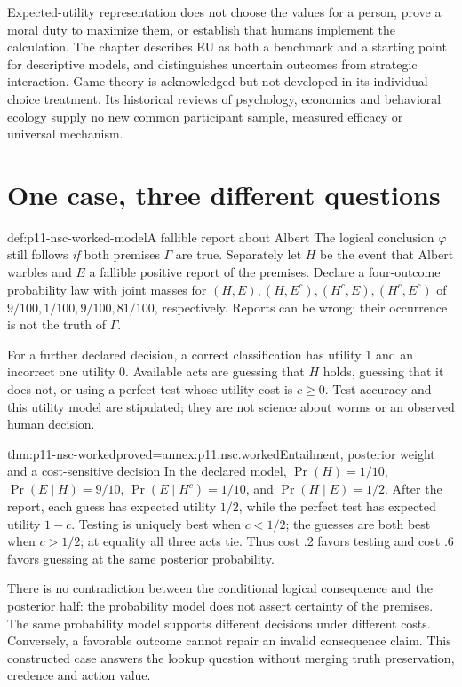 Expected-utility representation does not choose the values for a person,
prove a moral duty to maximize them, or establish that humans implement
the calculation. The chapter describes EU as both a benchmark and a
starting point for descriptive models, and distinguishes uncertain
outcomes from strategic interaction. Game theory is acknowledged but
not developed in its individual-choice treatment. Its historical reviews
of psychology, economics and behavioral ecology supply no new common
participant sample, measured efficacy or universal mechanism.

\section{One case, three different questions}
\label{sec:p11-nsc-worked}

\begin{hbdefinition}{def:p11-nsc-worked-model}{A fallible report about Albert}
The logical conclusion \(\varphi\) still follows \emph{if} both
premises \(\Gamma\) are true. Separately let \(H\) be the event that
Albert warbles and \(E\) a fallible positive report of the premises.
Declare a four-outcome probability law with joint masses for
\((H,E),(H,E^c),(H^c,E),(H^c,E^c)\) of
\(9/100,1/100,9/100,81/100\), respectively.
Reports can be wrong; their occurrence is not the truth of \(\Gamma\).

For a further declared decision, a correct classification has utility 1
and an incorrect one utility 0. Available acts are guessing that \(H\)
holds, guessing that it does not, or using a perfect test whose utility
cost is \(c\geq0\). Test accuracy and this utility model are stipulated;
they are not science about worms or an observed human decision.
\end{hbdefinition}

\begin{hbtheorem}{thm:p11-nsc-worked}{proved=annex:p11.nsc.worked}{Entailment, posterior weight and a cost-sensitive decision}
In the declared model, \(\Pr(H)=1/10\),
\(\Pr(E\mid H)=9/10\), \(\Pr(E\mid H^c)=1/10\), and
\(\Pr(H\mid E)=1/2\). After the report, each guess has expected
utility \(1/2\), while the perfect test has expected utility \(1-c\).
Testing is uniquely best when \(c<1/2\); the guesses are both best
when \(c>1/2\); at equality all three acts tie. Thus cost .2 favors
testing and cost .6 favors guessing at the same posterior probability.
\end{hbtheorem}

There is no contradiction between the conditional logical consequence
and the posterior half: the probability model does not assert certainty
of the premises. The same probability model supports different decisions
under different costs. Conversely, a favorable outcome cannot repair
an invalid consequence claim. This constructed case answers the lookup
question without merging truth preservation, credence and action value.

